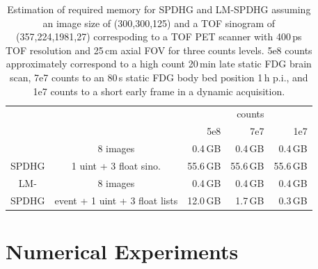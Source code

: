\begin{table}
\begin{center}
\footnotesize
\begin{tabular}{ c c r r r}
         &                       &            & counts      & \\ 
         &                       & 5e8        & 7e7         & 1e7 \\ \hline
         & 8 images              &   0.4\,GB  &   0.4\,GB   &   0.4\,GB \\
SPDHG    & 1 uint + 3 float sino.&  55.6\,GB  &  55.6\,GB   &  55.6\,GB \\ \hline
LM-      & 8 images              &   0.4\,GB  &   0.4\,GB   &   0.4\,GB \\
SPDHG    & event + 1 uint + 3 float lists &  12.0\,GB  &   1.7\,GB   &   0.3\,GB
\end{tabular}
\end{center}
\caption{Estimation of required memory for SPDHG and LM-SPDHG assuming an image size of (300,300,125)
         and a TOF sinogram of (357,224,1981,27) correspoding to a TOF PET scanner with 400\,ps TOF
         resolution and 25\,cm axial FOV for three counts levels. 5e8 counts approximately correspond
         to a high count 20\,min late static FDG brain scan, 
         7e7 counts to an 80\,s static FDG body bed position 1\,h p.i., 
         and 1e7 counts to a short early frame in a dynamic acquisition.}
\label{tab:mem}
\end{table}


\section{Numerical Experiments}

